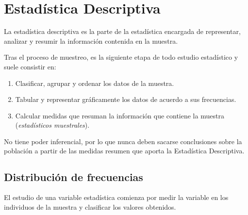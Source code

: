 \documentclass[
  a4paper,
]{scrreport}
\theoremstyle{plain}
\theoremstyle{definition}
\theoremstyle{definition}
\theoremstyle{remark}
\begin{document}

\hypertarget{estaduxedstica-descriptiva}{%
\chapter{Estadística Descriptiva}\label{estaduxedstica-descriptiva}}

La estadística descriptiva es la parte de la estadística encargada de
representar, analizar y resumir la información contenida en la muestra.

Tras el proceso de muestreo, es la siguiente etapa de todo estudio
estadístico y suele consistir en:

\begin{enumerate}
\def\labelenumi{\arabic{enumi}.}
\item
  Clasificar, agrupar y ordenar los datos de la muestra.
\item
  Tabular y representar gráficamente los datos de acuerdo a sus
  frecuencias.
\item
  Calcular medidas que resuman la información que contiene la muestra
  (\emph{estadísticos muestrales}).
\end{enumerate}

\begin{tcolorbox}[enhanced jigsaw, arc=.35mm, leftrule=.75mm, bottomtitle=1mm, colbacktitle=quarto-callout-important-color!10!white, title=\textcolor{quarto-callout-important-color}{\faExclamation}\hspace{0.5em}{Importante}, opacitybacktitle=0.6, bottomrule=.15mm, opacityback=0, breakable, colframe=quarto-callout-important-color-frame, coltitle=black, toprule=.15mm, toptitle=1mm, titlerule=0mm, rightrule=.15mm, left=2mm, colback=white]

No tiene poder inferencial, por lo que nunca deben sacarse conclusiones
sobre la población a partir de las medidas resumen que aporta la
Estadística Descriptiva.

\end{tcolorbox}

\hypertarget{distribuciuxf3n-de-frecuencias}{%
\section{Distribución de
frecuencias}\label{distribuciuxf3n-de-frecuencias}}

El estudio de una variable estadística comienza por medir la variable en
los individuos de la muestra y clasificar los valores obtenidos.
\end{document}

